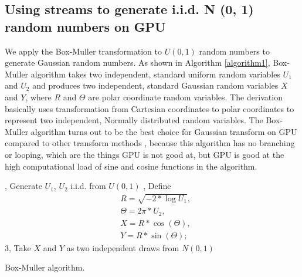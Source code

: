 \documentclass[article,nojss]{jss}\usepackage[]{graphicx}\usepackage[]{color}
\begin{document}
\subsection{Using streams to generate i.i.d. N (0, 1) random numbers on GPU}
We apply the Box-Muller transformation to $U (0,1)$ random numbers to generate Gaussian random numbers. As shown in Algorithm \ref{algorithm1}, Box-Muller algorithm takes two independent, standard uniform random variables $U_1$ and $U_2$ and produces two independent, standard Gaussian random variables $X$ and $Y$, where $R$ and $\Theta$ are polar coordinate random variables. The derivation basically uses transformation from Cartesian coordinates to polar coordinates to represent two independent, Normally distributed random variables. The Box-Muller algorithm turns out to be the best choice for Gaussian transform on GPU compared to other transform methods \citep{howes2007efficient}, because this algorithm has no branching or looping, which are the things GPU is not good at, but GPU is good at the high computational load of sine and cosine functions in the algorithm. 

\begin{algorithm*}[H] \label{algorithm1}
, Generate $U_1$, $U_2$ i.i.d. from $U (0,1)$ , Define \begin{align*} 
& R = \sqrt{-2*\log U_1},\\
&  \Theta = 2\pi*U_2,\\
&  X=R*\cos(\Theta),\\
& Y=R*\sin(\Theta);\;\end{align*}
 3, Take $X$ and $Y$ as two independent draws from $N(0,1)$\;
 \caption{Box-Muller algorithm.}
\end{algorithm*}
\end{document}
